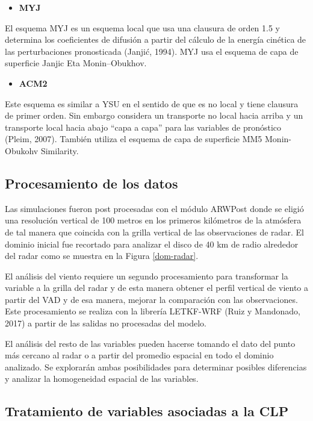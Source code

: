 \documentclass[12pt,spanish,oneside]{book}
\providecommand{\tightlist}{%
  \setlength{\itemsep}{0pt}\setlength{\parskip}{0pt}}
\begin{document}
\begin{itemize}
\tightlist
\item
  \textbf{MYJ}
\end{itemize}

El esquema MYJ es un esquema local que usa una clausura de orden 1.5 y
determina los coeficientes de difusión a partir del cálculo de la
energía cinética de las perturbaciones pronosticada (Janjić, 1994). MYJ
usa el esquema de capa de superficie Janjic Eta Monin--Obukhov.

\begin{itemize}
\tightlist
\item
  \textbf{ACM2}
\end{itemize}

Este esquema es similar a YSU en el sentido de que es no local y tiene
clausura de primer orden. Sin embargo considera un transporte no local
hacia arriba y un transporte local hacia abajo ``capa a capa'' para las
variables de pronóstico (Pleim, 2007). También utiliza el esquema de
capa de superficie MM5 Monin-Obukohv Similarity.

\subsection{Procesamiento de los
datos}\label{procesamiento-de-los-datos}

Las simulaciones fueron post procesadas con el módulo ARWPost donde se
eligió una resolución vertical de 100 metros en los primeros kilómetros
de la atmósfera de tal manera que coincida con la grilla vertical de las
observaciones de radar. El dominio inicial fue recortado para analizar
el disco de 40 km de radio alrededor del radar como se muestra en la
Figura \ref{dom-radar}.

El análisis del viento requiere un segundo procesamiento para
transformar la variable a la grilla del radar y de esta manera obtener
el perfil vertical de viento a partir del VAD y de esa manera, mejorar
la comparación con las observaciones. Este procesamiento se realiza con
la librería LETKF-WRF (Ruiz y Mandonado, 2017) a partir de las salidas
no procesadas del modelo.

El análisis del resto de las variables pueden hacerse tomando el dato
del punto más cercano al radar o a partir del promedio espacial en todo
el dominio analizado. Se explorarán ambas posibilidades para determinar
posibles diferencias y analizar la homogeneidad espacial de las
variables.

\subsection{Tratamiento de variables asociadas a la
CLP}\label{tratamiento-de-variables-asociadas-a-la-clp}
\end{document}
